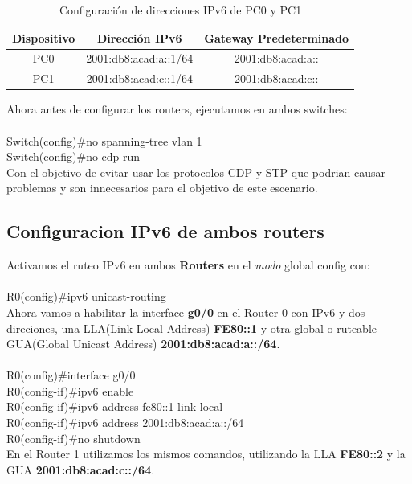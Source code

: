 \documentclass[a4paper,12pt]{article}
\begin{document}
\begin{table}[h]
    \centering
    \begin{tabular}{|c|c|c|}
        \hline
        \textbf{Dispositivo} & \textbf{Dirección IPv6} & \textbf{Gateway Predeterminado} \\
        \hline
        PC0 & 2001:db8:acad:a::1/64 & 2001:db8:acad:a:: \\
        \hline
        PC1 & 2001:db8:acad:c::1/64 & 2001:db8:acad:c:: \\
        \hline
    \end{tabular}
    \caption{Configuración de direcciones IPv6 de PC0 y PC1}
    \label{tab:ipv6_config}
\end{table}

Ahora antes de configurar los routers, ejecutamos en ambos switches:\\
\noindent\\
Switch(config)\#no spanning-tree vlan 1\\
Switch(config)\#no cdp run\\

Con el objetivo de evitar usar los protocolos CDP y STP que podrian causar problemas y son innecesarios para el objetivo de este escenario.\\
\subsection{Configuracion IPv6 de ambos routers}
Activamos el ruteo IPv6 en ambos \textbf{Routers} en el \textit{modo} global config con:\\
\noindent\\
R0(config)\#ipv6 unicast-routing\\

Ahora vamos a habilitar la interface \textbf{g0/0} en el Router 0 con IPv6 y dos direciones, una LLA(Link-Local Address) \textbf{FE80::1} y otra global o ruteable GUA(Global Unicast Address)\textbf{ 2001:db8:acad:a::/64}.\\
\noindent\\
R0(config)\#interface g0/0\\
R0(config-if)\#ipv6 enable\\
R0(config-if)\#ipv6 address fe80::1 link-local\\
R0(config-if)\#ipv6 address 2001:db8:acad:a::/64\\
R0(config-if)\#no shutdown\\

En el Router 1 utilizamos los mismos comandos, utilizando la LLA \textbf{FE80::2} y la GUA \textbf{2001:db8:acad:c::/64}.\\
\end{document}
